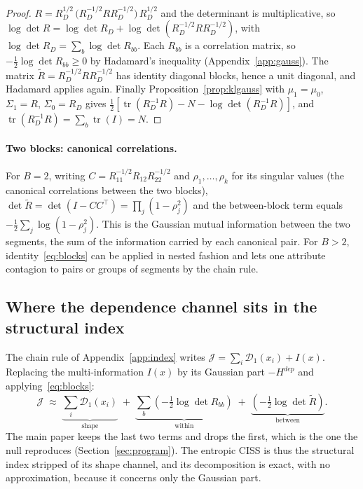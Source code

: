 \documentclass[11pt]{article}
\theoremstyle{definition}
\theoremstyle{remark}
\newcommand{\JJ}{\mathcal{J}}
\newcommand{\Dun}{\mathcal{D}_1}
\begin{document}
\begin{proof}
$R=R_D^{1/2}\,\big(R_D^{-1/2}RR_D^{-1/2}\big)\,R_D^{1/2}$ and the determinant is
multiplicative, so $\log\det R=\log\det R_D+\log\det(R_D^{-1/2}RR_D^{-1/2})$,
with $\log\det R_D=\sum_b\log\det R_{bb}$. Each $R_{bb}$ is a correlation matrix,
so $-\tfrac12\log\det R_{bb}\ge0$ by Hadamard's inequality
(Appendix~\ref{app:gauss}). The matrix $\tilde R=R_D^{-1/2}RR_D^{-1/2}$ has
identity diagonal blocks, hence a unit diagonal, and Hadamard applies again.
Finally Proposition~\ref{prop:klgauss} with $\mu_1=\mu_0$, $\Sigma_1=R$,
$\Sigma_0=R_D$ gives
$\tfrac12[\operatorname{tr}(R_D^{-1}R)-N-\log\det(R_D^{-1}R)]$, and
$\operatorname{tr}(R_D^{-1}R)=\sum_b\operatorname{tr}(I)=N$.
\end{proof}

\paragraph{Two blocks: canonical correlations.} For $B=2$, writing
$C=R_{11}^{-1/2}R_{12}R_{22}^{-1/2}$ and $\rho_1,\dots,\rho_k$ for its singular
values (the canonical correlations between the two blocks),
$\det\tilde R=\det(I-CC^\top)=\prod_j(1-\rho_j^2)$ and the between-block term
equals $-\tfrac12\sum_j\log(1-\rho_j^2)$. This is the Gaussian mutual
information between the two segments, the sum of the information carried by each
canonical pair. For $B>2$, identity~\eqref{eq:blocks} can be applied in nested
fashion and lets one attribute contagion to pairs or groups of segments by the
chain rule.

\subsection{Where the dependence channel sits in the structural index}

The chain rule of Appendix~\ref{app:index} writes $\JJ=\sum_i\Dun(x_i)+I(x)$.
Replacing the multi-information $I(x)$ by its Gaussian part $-H^{dep}$ and
applying~\eqref{eq:blocks}:
\begin{equation}
\label{eq:jblocks}
\JJ\;\approx\;\underbrace{\sum_i\Dun(x_i)}_{\text{shape}}
\;+\;\underbrace{\sum_b\left(-\tfrac12\log\det R_{bb}\right)}_{\text{within}}
\;+\;\underbrace{\left(-\tfrac12\log\det\tilde R\right)}_{\text{between}} .
\end{equation}
The main paper keeps the last two terms and drops the first, which is the one
the null reproduces (Section~\ref{sec:program}). The entropic CISS is thus the
structural index stripped of its shape channel, and its decomposition is exact,
with no approximation, because it concerns only the Gaussian part.
\end{document}
